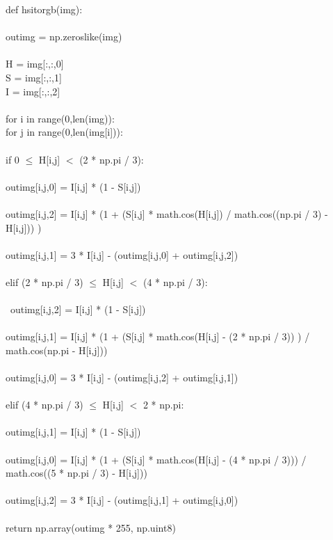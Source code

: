 \documentclass{article}
\begin{document}
	\noindent def hsi\textunderscore to\textunderscore rgb(img):\\
	\\
	\indent out\textunderscore img = np.zeros\textunderscore like(img)\\
	\\
	\indent H = img[:,:,0]\\
	\indent S = img[:,:,1]\\
	\indent I = img[:,:,2]\\
	\\
	\indent for i in range(0,len(img)):\\
	\indent \indent for j in range(0,len(img[i])):\\
	\\
	\indent \indent \indent if 0 $\leq$ H[i,j] $<$ (2 * np.pi / 3):\\
	\\
	\indent \indent \indent \indent out\textunderscore img[i,j,0] = I[i,j] * (1 - S[i,j])\\
	\\
	\indent \indent \indent \indent out\textunderscore img[i,j,2] = I[i,j] * (1 + (S[i,j] * math.cos(H[i,j]) / math.cos((np.pi / 3) - H[i,j])) )\\
	\\
	\indent \indent \indent \indent out\textunderscore img[i,j,1] = 3 * I[i,j] - (out\textunderscore img[i,j,0] + out\textunderscore img[i,j,2])\\
	\\
	\indent \indent \indent elif (2 * np.pi / 3) $\leq$ H[i,j] $<$ (4 * np.pi / 3):\\
	\\\
	\indent \indent \indent \indent out\textunderscore img[i,j,2] = I[i,j] * (1 - S[i,j])\\
	\\
	\indent \indent \indent \indent out\textunderscore img[i,j,1] = I[i,j] * (1 + (S[i,j] * math.cos(H[i,j] - (2 * np.pi / 3)) ) / math.cos(np.pi - H[i,j]))\\
	\\
	\indent \indent \indent \indent out\textunderscore img[i,j,0] = 3 * I[i,j] - (out\textunderscore img[i,j,2] + out\textunderscore img[i,j,1])\\
	\\
	\indent \indent \indent elif (4 * np.pi / 3) $\leq$ H[i,j] $<$ 2 * np.pi:\\
	\\
	\indent \indent \indent \indent out\textunderscore img[i,j,1] = I[i,j] * (1 - S[i,j])\\
	\\
	\indent \indent \indent \indent out\textunderscore img[i,j,0] = I[i,j] * (1 + (S[i,j] * math.cos(H[i,j] - (4 * np.pi / 3))) / math.cos((5 * np.pi / 3) - H[i,j]))\\
	\\
	\indent \indent \indent \indent out\textunderscore img[i,j,2] = 3 * I[i,j] - (out\textunderscore img[i,j,1] + out\textunderscore img[i,j,0])\\
	\\
	\indent return np.array(out\textunderscore img * 255, np.uint8)
	
\end{document}
